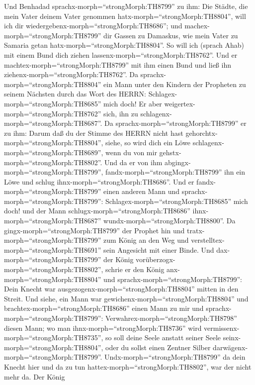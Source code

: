Und Benhadad sprachx-morph=``strongMorph:TH8799'' zu ihm: Die Städte,
die mein Vater deinem Vater genommen hatx-morph=``strongMorph:TH8804'',
will ich dir wiedergebenx-morph=``strongMorph:TH8686''; und
machex-morph=``strongMorph:TH8799'' dir Gassen zu Damaskus, wie mein
Vater zu Samaria getan hatx-morph=``strongMorph:TH8804''. So will ich
(sprach Ahab) mit einem Bund dich ziehen
lassenx-morph=``strongMorph:TH8762''. Und er
machtex-morph=``strongMorph:TH8799'' mit ihm einen Bund und ließ ihn
ziehenx-morph=``strongMorph:TH8762''.  Da
sprachx-morph=``strongMorph:TH8804'' ein Mann unter den Kindern der
Propheten zu seinem Nächsten durch das Wort des HERRN:
Schlagex-morph=``strongMorph:TH8685'' mich doch! Er aber
weigertex-morph=``strongMorph:TH8762'' sich, ihn zu
schlagenx-morph=``strongMorph:TH8687''.  Da
sprachx-morph=``strongMorph:TH8799'' er zu ihm: Darum daß du der Stimme
des HERRN nicht hast gehorchtx-morph=``strongMorph:TH8804'', siehe, so
wird dich ein Löwe schlagenx-morph=``strongMorph:TH8689'', wenn du von
mir gehstx-morph=``strongMorph:TH8802''. Und da er von ihm
abgingx-morph=``strongMorph:TH8799'', fandx-morph=``strongMorph:TH8799''
ihn ein Löwe und schlug ihnx-morph=``strongMorph:TH8686''. 
Und er fandx-morph=``strongMorph:TH8799'' einen anderen Mann und
sprachx-morph=``strongMorph:TH8799'':
Schlagex-morph=``strongMorph:TH8685'' mich doch! und der Mann
schlugx-morph=``strongMorph:TH8686'' ihnx-morph=``strongMorph:TH8687''
wundx-morph=``strongMorph:TH8800''.  Da
gingx-morph=``strongMorph:TH8799'' der Prophet hin und
tratx-morph=``strongMorph:TH8799'' zum König an den Weg und
verstelltex-morph=``strongMorph:TH8691'' sein Angesicht mit einer Binde.
 Und dax-morph=``strongMorph:TH8799'' der König
vorüberzogx-morph=``strongMorph:TH8802'', schrie er den König
anx-morph=``strongMorph:TH8804'' und
sprachx-morph=``strongMorph:TH8799'': Dein Knecht war
ausgezogenx-morph=``strongMorph:TH8804'' mitten in den Streit. Und
siehe, ein Mann war gewichenx-morph=``strongMorph:TH8804'' und
brachtex-morph=``strongMorph:TH8686'' einen Mann zu mir und
sprachx-morph=``strongMorph:TH8799'':
Verwahrex-morph=``strongMorph:TH8798'' diesen Mann; wo man
ihnx-morph=``strongMorph:TH8736'' wird
vermissenx-morph=``strongMorph:TH8735'', so soll deine Seele anstatt
seiner Seele seinx-morph=``strongMorph:TH8804'', oder du sollst einen
Zentner Silber darwägenx-morph=``strongMorph:TH8799''. 
Undx-morph=``strongMorph:TH8799'' da dein Knecht hier und da zu tun
hattex-morph=``strongMorph:TH8802'', war der nicht mehr da. Der König
